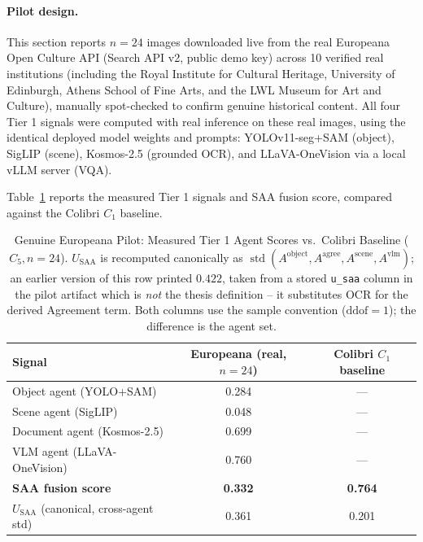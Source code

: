 \documentclass[12pt,a4paper]{report}
\begin{document}
\paragraph{Pilot design.} This section reports $n=24$ images downloaded live from the real Europeana Open Culture API (Search API v2, public demo key) across 10 verified real institutions (including the Royal Institute for Cultural Heritage, University of Edinburgh, Athens School of Fine Arts, and the LWL Museum for Art and Culture), manually spot-checked to confirm genuine historical content. All four Tier 1 signals were computed with real inference on these real images, using the identical deployed model weights and prompts: YOLOv11-seg+SAM (object), SigLIP (scene), Kosmos-2.5 (grounded OCR), and LLaVA-OneVision via a local vLLM server (VQA).

Table~\ref{tab:europeana_real_pilot} reports the measured Tier 1 signals and SAA fusion score, compared against the Colibri $C_1$ baseline.

\begin{table}[!htbp]
\centering
\caption[Genuine Europeana Pilot]{Genuine Europeana Pilot: Measured Tier 1 Agent Scores vs.\ Colibri Baseline ($C_5, n=24$). $U_{\text{SAA}}$ is recomputed canonically as $\operatorname{std}(A^{\text{object}}, A^{\text{agree}}, A^{\text{scene}}, A^{\text{vlm}})$; an earlier version of this row printed $0.422$, taken from a stored \texttt{u\_saa} column in the pilot artifact which is \emph{not} the thesis definition -- it substitutes OCR for the derived Agreement term. Both columns use the sample convention ($\mathrm{ddof}{=}1$); the difference is the agent set.}
\label{tab:europeana_real_pilot}
\begin{tabular}{lcc}
\toprule
\textbf{Signal} & \textbf{Europeana (real, $n=24$)} & \textbf{Colibri $C_1$ baseline} \\
\midrule
Object agent (YOLO+SAM)     & 0.284 & --- \\
Scene agent (SigLIP)        & 0.048 & --- \\
Document agent (Kosmos-2.5) & 0.699 & --- \\
VLM agent (LLaVA-OneVision) & 0.760 & --- \\
\textbf{SAA fusion score}   & \textbf{0.332} & \textbf{0.764} \\
$U_{\text{SAA}}$ (canonical, cross-agent std) & 0.361 & 0.201 \\
\bottomrule
\end{tabular}
\end{table}
\end{document}
